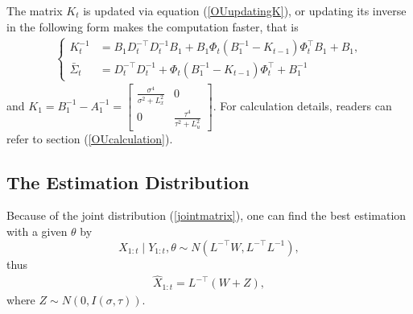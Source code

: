 The matrix $K_{t}$ is updated via equation (\ref{OUupdatingK}), or updating its inverse in the following form makes the computation faster, that is 
\begin{align*}
\begin{cases}
K_{t}^{-1} &= B_1D_{t}^{-\top}D_{t}^{-1}B_1 + B_1\Phi_{t} (B_1^{-1} - K_{t-1}) \Phi_{t}^\top B_1+ B_1,\\
\bar{\Sigma}_{t}&= D_{t}^{-\top}D_{t}^{-1}+ \Phi_{t} (B_1^{-1} - K_{t-1}) \Phi_{t}^\top + B_1^{-1}
\end{cases}
\end{align*}
and $K_1 =B_1^{-1} - A_1^{-1} = \begin{bmatrix}
\frac{\sigma^4}{\sigma^2 +L_x^2} & 0 \\ 0 &\frac{\tau^4}{\tau^2 +L_u^2}
\end{bmatrix} $. For calculation details, readers can refer to section (\ref{OUcalculation}). 

\subsection{The Estimation Distribution}

Because of the joint distribution (\ref{jointmatrix}), one can find the best estimation with a given $\theta$ by
\begin{equation*}
X_{1:t} \mid Y_{1:t},\theta \sim N(L^{-\top}W,L^{-\top}L^{-1}),
\end{equation*}
thus
\begin{align*}
\hat{X} _{1:t}= L^{-\top}(W+Z),
\end{align*}
where $Z \sim N(0, I(\sigma,\tau))$.


